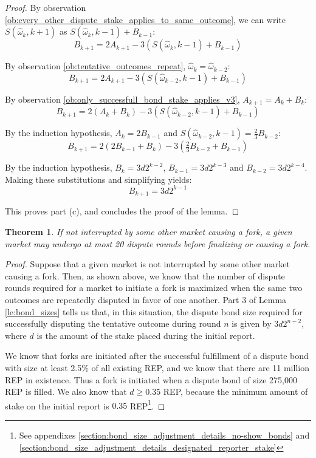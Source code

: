 \documentclass[floatfix,reprint,nofootinbib,amsmath,amssymb,epsfig,pre,floats,letterpaper,groupedaffiliation]{revtex4-1}
\newtheorem{theorem}{Theorem}
\theoremstyle{definition}
\theoremstyle{definition}
\begin{document}
\begin{appendix}
\begin{proof}
By observation \ref{ob:every_other_dispute_stake_applies_to_same_outcome}, we can write $S(\hat{\omega}_{k},k+1)$ as $S(\hat{\omega}_{k},k-1)+B_{k-1}$:
\[ B_{k+1}=2A_{k+1}-3\left(S(\hat{\omega}_{k},k-1)+B_{k-1}\right) \]

By observation \ref{ob:tentative_outcomes_repeat}, $\hat{\omega}_{k}=\hat{\omega}_{k-2}$:
\[ B_{k+1}=2A_{k+1}-3\left(S(\hat{\omega}_{k-2},k-1)+B_{k-1}\right) \]

By observation \ref{ob:only_successfull_bond_stake_applies_v3}, $A_{k+1}=A_{k}+B_{k}$:
\[ B_{k+1}=2\left(A_{k}+B_{k}\right)-3\left(S(\hat{\omega}_{k-2},k-1)+B_{k-1}\right) \]

By the induction hypothesis, $A_{k}=2B_{k-1}$ and $S(\hat{\omega}_{k-2},k-1)=\frac{2}{3}B_{k-2}$:
\[ B_{k+1}=2\left(2B_{k-1}+B_{k}\right)-3\left(\tfrac{2}{3}B_{k-2}+B_{k-1}\right) \]

By the induction hypothesis, $B_{k}=3d2^{k-2}$, $B_{k-1}=3d2^{k-3}$ and $B_{k-2}=3d2^{k-4}$.  Making these substitutions and simplifying yields:
\[ B_{k+1}=3d2^{k-1} \]

This proves part (c), and concludes the proof of the lemma.
\end{proof}

\begin{theorem}\label{th:twenty_rounds}
If not interrupted by some other market causing a fork, a given market may undergo at most 20 dispute rounds before finalizing or causing a fork.
\end{theorem}

\begin{proof}
Suppose that a given market is not interrupted by some other market causing a fork. Then, as shown above, we know that the number of dispute rounds required for a market to initiate a fork is maximized when the same two outcomes are repeatedly disputed in favor of one another.  Part 3 of Lemma \ref{le:bond_sizes} tells us that, in this situation, the dispute bond size required for successfully disputing the tentative outcome during round $n$ is given by $3d2^{n-2}$, where $d$ is the amount of the stake placed during the initial report.

We know that forks are initiated after the successful fulfillment of a dispute bond with size at least 2.5\% of all existing REP, and we know that there are 11 million REP in existence. Thus a fork is initiated when a dispute bond of size 275,000 REP is filled. We also know that $d \geq 0.35$ REP, because the minimum amount of stake on the initial report is $0.35$ REP\footnote{See appendixes \ref{section:bond_size_adjustment_details_no-show_bonds} and \ref{section:bond_size_adjustment_details_designated_reporter_stake}}.


\end{proof}
\end{appendix}
\end{document}
